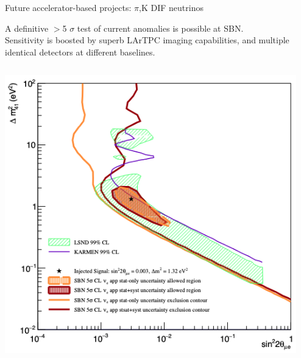 \begin{frame}[t]{Future accelerator-based projects: $\pi$,K DIF neutrinos}

  {\small
    A definitive $>$5 $\sigma$ test of current anomalies is possible at SBN.\\
    Sensitivity is boosted by superb LArTPC imaging capabilities, and
    multiple identical detectors at different baselines.\\
  }

  \begin{columns}[T]
    \begin{column}{0.50\textwidth}
      \begin{center}
        \includegraphics[width=0.99\textwidth]{./images/beyond3nu/sbn_b}
      \end{center}
    \end{column}
    \begin{column}{0.50\textwidth}
      \begin{center}

\end{center}
\end{column}
\end{columns}
\end{frame}
